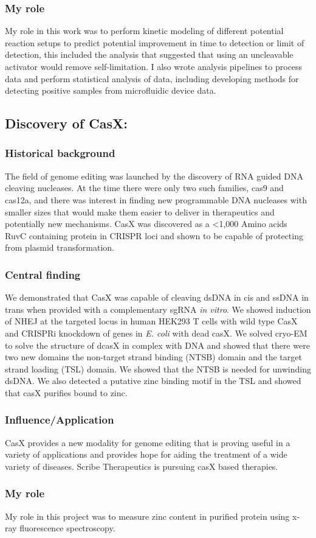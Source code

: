 \documentclass{article}
\begin{document}
\subsubsection{My role}
My role in this work was to perform kinetic modeling of different potential reaction setups to predict potential improvement in time to detection or limit of detection, this included the analysis that suggested that using an uncleavable activator would remove self-limitation.
I also wrote analysis pipelines to process data and perform statistical analysis of data, including developing methods for detecting positive samples from microfluidic device data.
%
\nocite{Liu2021-pu}
\printbibliography[heading=none]

\leavevmode\pagebreak


\newrefsection
\subsection{Discovery of CasX:}
\subsubsection{Historical background}
The field of genome editing was launched by the discovery of RNA guided DNA cleaving nucleases.
At the time there were only two such families, cas9 and cas12a, and there was interest in finding new programmable DNA nucleases with smaller sizes that would make them easier to deliver in therapeutics and potentially new mechanisms.
CasX was discovered as a <1,000 Amino acids RuvC containing protein in CRISPR loci and shown to be capable of protecting from plasmid transformation.
%
\subsubsection{Central finding}
We demonstrated that CasX was capable of cleaving dsDNA in cis and ssDNA in trans when provided with a complementary sgRNA \textit{in vitro}.
We showed induction of NHEJ at the targeted locus in human HEK293 T cells with wild type CasX and CRISPRi knockdown of genes in \textit{E. coli} with dead casX.
We solved cryo-EM to solve the structure of dcasX in complex with DNA and showed that there were two new domains the non-target strand binding (NTSB) domain and the target strand loading (TSL) domain.
We showed that the NTSB is needed for unwinding dsDNA.
We also detected a putative zinc binding motif in the TSL and showed that casX purifies bound to zinc.
%
\subsubsection{Influence/Application}
CasX provides a new modality for genome editing that is proving useful in a variety of applications and provides hope for aiding the treatment of a wide variety of diseases.
Scribe Therapeutics is pursuing casX based therapies.
%
\subsubsection{My role}
My role in this project was to measure zinc content in purified protein using x-ray fluorescence spectroscopy.
%
\nocite{Liu2019-nk}
\printbibliography[heading=none]
\end{document}
